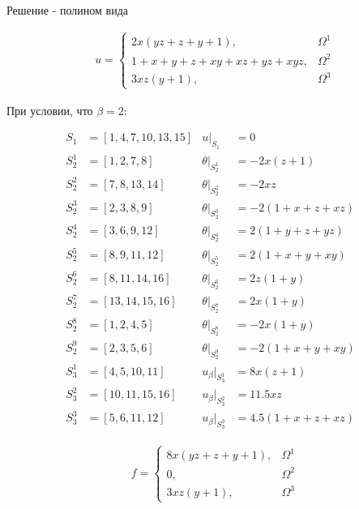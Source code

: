 \documentclass[12pt, a4paper]{article}
\begin{document}
\noindent Решение - полином вида

\vspace{1mm}
\begin{align*}
  &u = 
  \begin{cases} 
      2x(yz + z + y + 1), & \Omega^1 \\
      1 + x + y + z + xy + xz + yz + xyz, & \Omega^2 \\
      3xz(y + 1), & \Omega^3
  \end{cases}
\end{align*}
\vspace{1mm}

\noindent При условии, что $\beta = 2$: 

\begin{align*}
  S_1 &= \left[ 1, 4, 7, 10, 13, 15 \right] & u|_{S_1} &= 0 \\
  S_2^1 &= \left[ 1, 2, 7, 8 \right] & \theta|_{S_2^1} &= -2x(z + 1) \\
  S_2^2 &= \left[ 7, 8, 13, 14 \right] & \theta|_{S_2^2} &= -2xz \\
  S_2^3 &= \left[ 2, 3, 8, 9 \right] & \theta|_{S_2^3} &= -2(1 + x + z + xz) \\
  S_2^4 &= \left[ 3, 6, 9, 12 \right] & \theta|_{S_2^4} &= 2(1 + y + z + yz) \\
  S_2^5 &= \left[ 8, 9, 11, 12 \right] & \theta|_{S_2^5} &= 2(1 + x + y + xy) \\
  S_2^6 &= \left[ 8, 11, 14, 16 \right] & \theta|_{S_2^6} &= 2z(1 + y) \\
  S_2^7 &= \left[ 13, 14, 15, 16 \right] & \theta|_{S_2^7} &= 2x(1 + y) \\
  S_2^8 &= \left[ 1, 2, 4, 5 \right] & \theta|_{S_2^8} &= -2x(1 + y) \\
  S_2^9 &= \left[ 2, 3, 5, 6 \right] & \theta|_{S_2^9} &= -2(1 + x + y + xy) \\
  S_3^1 &= \left[ 4, 5, 10, 11 \right] & u_{\beta}|_{S_3^1} &= 8x(z + 1) \\
  S_3^2 &= \left[ 10, 11, 15, 16 \right] & u_{\beta}|_{S_3^2} &= 11.5xz \\
  S_3^3 &= \left[ 5, 6, 11, 12 \right] & u_{\beta}|_{S_3^3} &= 4.5(1 + x + z + xz)
\end{align*}

\vspace{1mm}

\begin{align*}
  &f = 
  \begin{cases} 
      8x(yz + z + y + 1), & \Omega^1 \\
      0, & \Omega^2 \\
      3xz(y + 1), & \Omega^3
  \end{cases}
\end{align*}
\vspace{1mm}
\end{document}
